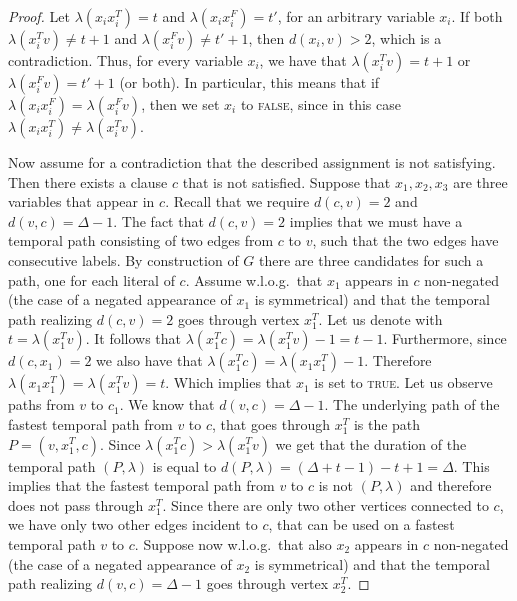 \documentclass[a4paper,UKenglish,cleveref, autoref, thm-restate]{lipics-v2021}
\begin{document}
\begin{proof}
Let $\lambda(x_i x_i^T)=t$ and $\lambda(x_i x_i^F)=t'$, for an arbitrary variable $x_i$. 
If both $\lambda(x_i^T v)\neq t+1$ and $\lambda(x_i^F v)\neq t'+1$, then $d(x_i,v)>2$, which is a contradiction. 
Thus, for every variable $x_i$, we have that $\lambda(x_i^T v)= t+1$ or $\lambda(x_i^F v)= t'+1$ (or both). 
In particular, this means that if $\lambda(x_i x_i^F)=\lambda(x_i^F v)$, then we set $x_i$ to \textsc{false}, since in this case $\lambda(x_i x_i^T)\neq\lambda(x_i^T v)$.


Now assume for a contradiction that the described assignment is not satisfying. Then there exists a clause $c$ that is not satisfied. 
Suppose that $x_1, x_2, x_3$ are three variables that appear in $c$.
Recall that we require $d(c,v)=2$ and $d(v,c)=\Delta -1$. 
The fact that $d(c,v)=2$ implies that we must have a temporal path consisting of two edges from $c$ to $v$, 
such that the two edges have consecutive labels. 
By construction of $G$ there are three candidates for such a path, one for each literal of $c$. 
Assume w.l.o.g.\ that $x_1$ appears in $c$ non-negated (the case of a negated appearance of $x_1$ is symmetrical) and that the temporal path realizing $d(c,v)=2$ goes through vertex $x_1^T$. 
Let us denote with $t = \lambda(x_1^T v)$.
It follows that $\lambda(x_1^T c)=\lambda(x_1^T v)-1 = t - 1$.
Furthermore, since $d(c,x_1)=2$ we also have that $\lambda(x_1^T c)=\lambda(x_1 x_1^T)-1$. 
Therefore $\lambda(x_1 x_1^T)=\lambda(x_1^T v) = t$. 
Which implies that $x_1$ is set to \textsc{true}.
%
Let us observe paths from $v$ to $c_1$.
We know that $d(v,c)=\Delta -1$.
The underlying path of the fastest temporal path from $v$ to $c$, that goes through $x_1^T$ is the path $P = (v,x_1^T,c)$.
Since $\lambda(x_1^Tc) > \lambda(x_1^T v)$ we get that the duration of the temporal path $(P,\lambda)$ is equal to 
$d(P,\lambda)= (\Delta + t-1) - t + 1 = \Delta$.
This implies that
the fastest temporal path from $v$ to $c$ is not $(P,\lambda)$ and therefore does not pass through $x_1^T$.
Since there are only two other vertices connected to $c$, 
we have only two other edges incident to $c$, that can be used on a fastest temporal path
$v$ to $c$.
Suppose now w.l.o.g.\ that also $x_2$ appears in $c$ non-negated (the case of a negated appearance of $x_2$ is symmetrical) and that the temporal path realizing $d(v,c)=\Delta-1$ goes through vertex $x_2^T$.

\end{proof}
\end{document}
